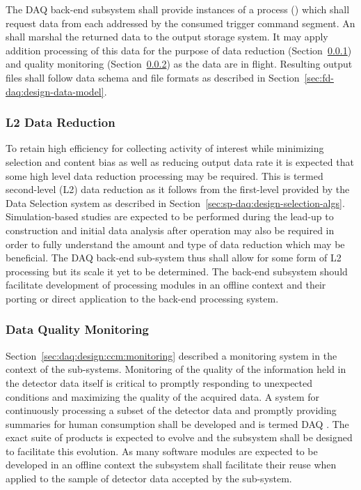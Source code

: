 
The DAQ back-end subsystem shall provide instances of a process () which shall request data from each  addressed by the consumed trigger command segment.  An  shall marshal the returned data to the output storage system.  It may apply addition processing of this data for the purpose of data reduction (Section~\ref{sec:fd-daq:design-data-reduction}) and quality monitoring (Section~\ref{sec:fd-daq:design-data-quality}) as the data are in flight. 
Resulting output files shall follow data schema and file formats as described in Section~\ref{sec:fd-daq:design-data-model}.


\subsubsection{L2 Data Reduction}
\label{sec:fd-daq:design-data-reduction}

To retain high efficiency for collecting activity of interest while minimizing selection and content bias as well as reducing output data rate it is expected that some high level data reduction processing may be required. 
This is termed second-level (L2) data reduction as it follows from the first-level provided by the Data Selection system as described in Section~\ref{sec:sp-daq:design-selection-algs}.
Simulation-based studies are expected to be performed during the lead-up to construction and initial data analysis after operation may also be required in order to fully understand the amount and type of data reduction which may be beneficial. 
The DAQ back-end sub-system thus shall allow for some form of L2 processing but its scale it yet to be determined. 
The back-end subsystem should facilitate development of processing modules in an offline context and their porting or direct application to the back-end processing system.



\subsubsection{Data Quality Monitoring}
\label{sec:fd-daq:design-data-quality}

Section~\ref{sec:daq:design:ccm:monitoring} described a monitoring system in the context of the  sub-systems. 
Monitoring of the quality of the information held in the detector data itself is critical to promptly responding to unexpected conditions and maximizing the quality of the acquired data. 
A system for continuously processing a subset of the detector data and promptly providing summaries for human consumption shall be developed and is termed DAQ .
The exact suite of products is expected to evolve and the  subsystem shall be designed to facilitate this evolution. 
As many software modules are expected to be developed in an offline context the  subsystem shall facilitate their reuse when applied to the sample of detector data accepted by the sub-system.


